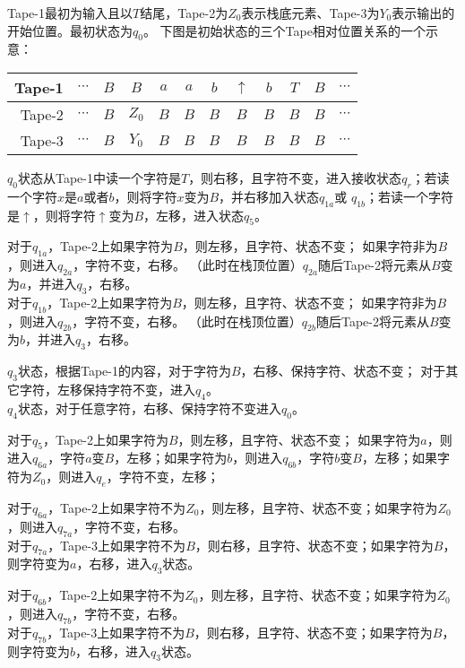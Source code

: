 \begin{solution}
    Tape-1最初为输入且以$T$结尾，Tape-2为$Z_0$表示栈底元素、Tape-3为$Y_0$表示输出的开始位置。最初状态为$q_0$。
    下图是初始状态的三个Tape相对位置关系的一个示意：
    \begin{center}
        \begin{tabular}{r||c|c|c|c|c|c|c|c|c|c|c}\hline
            Tape-1& $\cdots$&$B$&$B$ & $a$& $a$& $b$& $\uparrow$& $b$&$T$&$B$ & $\cdots$ \\\hline
            Tape-2& $\cdots$&$B$&$Z_0$ &$B$ &$B$ &$B$ &$B$ &$B$&$B$&$B$  &$\cdots$\\\hline
            Tape-3& $\cdots$&$B$&$Y_0$ &$B$ &$B$ &$B$ &$B$ &$B$&$B$&$B$  &$\cdots$\\\hline
        \end{tabular}
    \end{center}
    $q_0$状态从Tape-1中读一个字符是$T$，则右移，且字符不变，进入接收状态$q_r$；若读一个字符$x$是$a$或者$b$，则将字符$x$变为$B$，并右移加入状态$q_{1a}$或
    $q_{1b}$；若读一个字符是$\uparrow$，则将字符$\uparrow$变为$B$，左移，进入状态$q_5$。

    对于$q_{1a}$，Tape-2上如果字符为$B$，则左移，且字符、状态不变；
    如果字符非为$B$，则进入$q_{2a}$，字符不变，右移。
    （此时在栈顶位置）$q_{2a}$随后Tape-2将元素从$B$变为$a$，并进入$q_{3}$，右移。\\
    对于$q_{1b}$，Tape-2上如果字符为$B$，则左移，且字符、状态不变；
    如果字符非为$B$，则进入$q_{2b}$，字符不变，右移。
    （此时在栈顶位置）$q_{2b}$随后Tape-2将元素从$B$变为$b$，并进入$q_{3}$，右移。

    $q_{3}$状态，根据Tape-1的内容，对于字符为$B$，右移、保持字符、状态不变；
    对于其它字符，左移保持字符不变，进入$q_{4}$。\\
    $q_{4}$状态，对于任意字符，右移、保持字符不变进入$q_{0}$。

    
    对于$q_5$，Tape-2上如果字符为$B$，则左移，且字符、状态不变；
    如果字符为$a$，则进入$q_{6a}$，字符$a$变$B$，左移；如果字符为$b$，则进入$q_{6b}$，字符$b$变$B$，左移；如果字符为$Z_0$，则进入$q_e$，字符不变，左移；

    对于$q_{6a}$，Tape-2上如果字符不为$Z_0$，则左移，且字符、状态不变；如果字符为$Z_0$，则进入$q_{7a}$，字符不变，右移。\\
    对于$q_{7a}$，Tape-3上如果字符不为$B$，则右移，且字符、状态不变；如果字符为$B$，则字符变为$a$，右移，进入$q_{3}$状态。

    对于$q_{6b}$，Tape-2上如果字符不为$Z_0$，则左移，且字符、状态不变；如果字符为$Z_0$，则进入$q_{7b}$，字符不变，右移。\\
    对于$q_{7b}$，Tape-3上如果字符不为$B$，则右移，且字符、状态不变；如果字符为$B$，则字符变为$b$，右移，进入$q_{3}$状态。


\end{solution}
